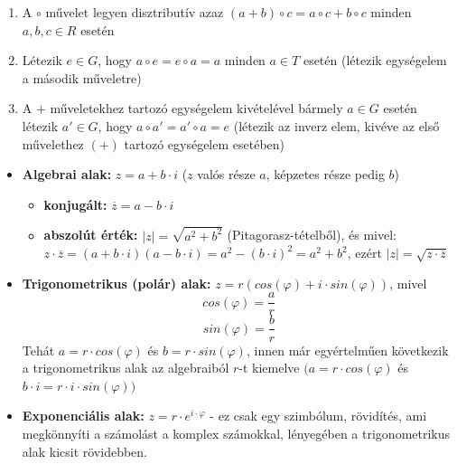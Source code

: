\documentclass[11pt,a4paper]{article}
\begin{document}
\begin{tcolorbox}[colback=green!5!white,colframe=green!60!black,title= 3. Csoport{,} gyűrű{,} test]
\begin{enumerate}
            \item A \(\circ\) művelet legyen disztributív azaz \((a + b) \circ c = a \circ c + b \circ c\) minden \(a, b, c \in R\) esetén
            \item Létezik \(e \in G\), hogy \(a \circ e = e \circ a = a\) minden \(a \in T\) esetén (létezik egységelem a második műveletre)
            \item A \(+\) műveletekhez tartozó egységelem kivételével bármely \(a \in G\) esetén létezik \(a' \in G\), hogy \(a \circ a' = a' \circ a = e\) (létezik az inverz elem, kivéve az első művelethez \((+)\) tartozó egységelem
            esetében)
        \end{enumerate}
\end{tcolorbox}

\begin{tcolorbox}[colback=green!5!white,colframe=green!60!black,title= 4. Komplex számok algebrai{,} trigonometrikus{,} exponenciális alakja]
    \begin{itemize}
        \item \textbf{Algebrai alak:} \(z = a + b\cdot i\) (\(z\) valós része \(a\), képzetes része pedig \(b\))
        \begin{itemize}
            \item \textbf{konjugált:} \(\overline{z} = a - b\cdot i\)
            \item \textbf{abszolút érték:} \(\left\lvert z \right\rvert  = \sqrt{a^2+b^2}\) (Pitagorasz-tételből), és mivel: \\ \(z \cdot \overline{z} = (a + b\cdot i)(a - b\cdot i) = a^2 -(b\cdot i)^2=a^2+b^2\), ezért \( \left\lvert z\right\rvert =\sqrt{z \cdot \overline{z} }  \)
        \end{itemize}
        \item \textbf{Trigonometrikus (polár) alak:} \(z = r(cos(\varphi ) + i \cdot sin(\varphi))\), mivel
        $$ cos(\varphi)=\frac{a}{r} $$
        $$ sin(\varphi)=\frac{b}{r} $$
        Tehát \(a = r\cdot cos(\varphi)\) és \(b = r\cdot sin(\varphi)\), innen már egyértelműen következik a trigonometrikus alak az algebraiból \(r\)-t kiemelve \((a = r\cdot cos(\varphi)\) és \(b\cdot i = r \cdot i\cdot sin(\varphi))\)
        \item \textbf{Exponenciális alak:} \(z = r \cdot e^{i\cdot \varphi}\) - ez csak egy szimbólum, rövidítés, ami megkönnyíti a
        számolást a komplex számokkal, lényegében a trigonometrikus alak kicsit rövidebben.
    \end{itemize}
\end{tcolorbox}
\end{document}
